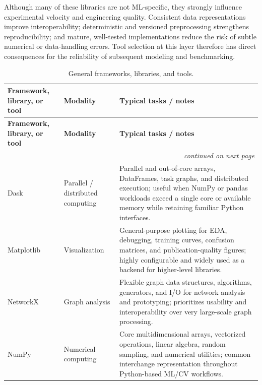 \documentclass{article}
\newcounter{entry}[section]
\renewcommand{\theentry}{\thesection.\arabic{entry}}
\newcommand{\EntryRow}[5]{
    \noalign{
        \stepcounter{entry}
        \xdef\ENTRYNUM{\theentry}
        \phantomsection\label{entry:#1}
        \addcontentsline{toc}{subsubsection}{\ENTRYNUM\hspace{0.5cm}#2}
    }
    #2 #3 & #4 & #5 \\
    \hline
}
\begin{document}
Although many of these libraries are not ML-specific, they strongly influence experimental velocity and engineering quality. Consistent data representations improve interoperability; deterministic and versioned preprocessing strengthens reproducibility; and mature, well-tested implementations reduce the risk of subtle numerical or data-handling errors. Tool selection at this layer therefore has direct consequences for the reliability of subsequent modeling and benchmarking.




\clearpage




\begin{longtable}{|p{}|p{}|p{}|}
    \caption{General frameworks, libraries, and tools.} \\


    \hline
    \textbf{Framework, library, or tool} & \textbf{Modality} & \textbf{Typical tasks / notes} \\
    \hline
    \endfirsthead

    \hline
    \textbf{Framework, library, or tool} & \textbf{Modality} & \textbf{Typical tasks / notes} \\
    \hline
    \endhead

    \multicolumn{3}{r}{\textit{continued on next page}} \\
    \endfoot

    \endlastfoot


    \EntryRow{dask}{Dask}{\cite{rocklin2015dask}}{Parallel / distributed computing}{Parallel and out-of-core arrays, DataFrames, task graphs, and distributed execution; useful when NumPy or pandas workloads exceed a single core or available memory while retaining familiar Python interfaces.}

    \EntryRow{matplotlib}{Matplotlib}{\cite{hunter2007matplotlib}}{Visualization}{General-purpose plotting for EDA, debugging, training curves, confusion matrices, and publication-quality figures; highly configurable and widely used as a backend for higher-level libraries.}

    \EntryRow{networkx}{NetworkX}{\cite{hagberg2008exploring}}{Graph analysis}{Flexible graph data structures, algorithms, generators, and I/O for network analysis and prototyping; prioritizes usability and interoperability over very large-scale graph processing.}

    \EntryRow{numpy}{NumPy}{\cite{harris2020array}}{Numerical computing}{Core multidimensional arrays, vectorized operations, linear algebra, random sampling, and numerical utilities; common interchange representation throughout Python-based ML/CV workflows.}


\end{longtable}
\end{document}
